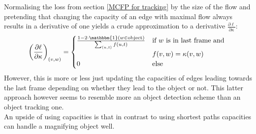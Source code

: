 \documentclass{article}
\begin{document}
{Normalising the loss from section \ref{MCFP for tracking} by the size of the flow and pretending that changing the capacity of an edge with maximal flow always results in a derivative of one yields a crude approximation to a derivative $\frac{\partial \ell}{\partial \kappa}$:
\begin{align*}
\left(\frac{\partial \ell}{\partial \kappa}\right)_{(v,w)} = 
\begin{cases}
\frac{1 - 2 \cdot \mathbbm{1}(w\in \textnormal{object})}{\sum_{(u,t)} f(u,t)} &\textnormal{if } w \textnormal{ is in last frame and }\\
& f(v,w) = \kappa(v,w)\\
0 &\textnormal{else}
\end{cases}
\end{align*}
However, this is more or less just updating the capacities of edges leading towards the last frame depending on whether they lead to the object or not. This latter approach however seems to resemble more an object detection scheme than an object tracking one.\\
An upside of using capacities is that in contrast to using shortest paths capacities can handle a magnifying object well.

}
\end{document}
